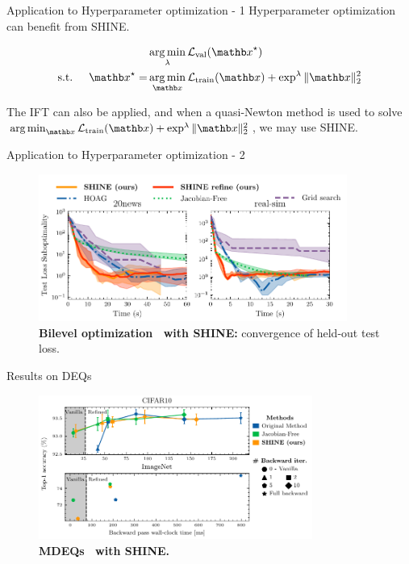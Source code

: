 \begin{frame}{Application to Hyperparameter optimization - 1}
    Hyperparameter optimization can benefit from SHINE.

    \begin{equation*}
        \begin{split}
            &\argmin_{\lambda} \mathcal{L}_{\text{val}}(\xb^\star)\\
            \text{s.t. } \quad \xb^\star = &\argmin_{\xb} \mathcal{L}_{\text{train}}(\xb) + \exp^{\lambda} \|\xb\|_2^2
        \end{split}
    \end{equation*}

    \pause
    The IFT can also be applied, and when a quasi-Newton method is used to solve $\argmin_{\xb} \mathcal{L}_{\text{train}}(\xb) + \exp^{\lambda} \|\xb\|_2^2$, we may use SHINE.
\end{frame}

\begin{frame}{Application to Hyperparameter optimization - 2}
    \begin{figure}
        \centering
        \includegraphics[width=0.9\textwidth]{Figures/shine_figures/bilevel_test.pdf}
        \caption{\textbf{Bilevel optimization~\citep{Pedregosa2016HyperparameterGradient} with SHINE:} convergence of held-out test loss.}
    \end{figure}

\end{frame}

\begin{frame}{Results on DEQs}
    \begin{figure}
        \centering
        \includegraphics[width=0.8\textwidth]{Figures/shine_figures/merged_results_latency_style.pdf}
        \caption{\textbf{MDEQs~\citep{Bai2020MultiscaleModels} with SHINE.}}
    \end{figure}
\end{frame}

